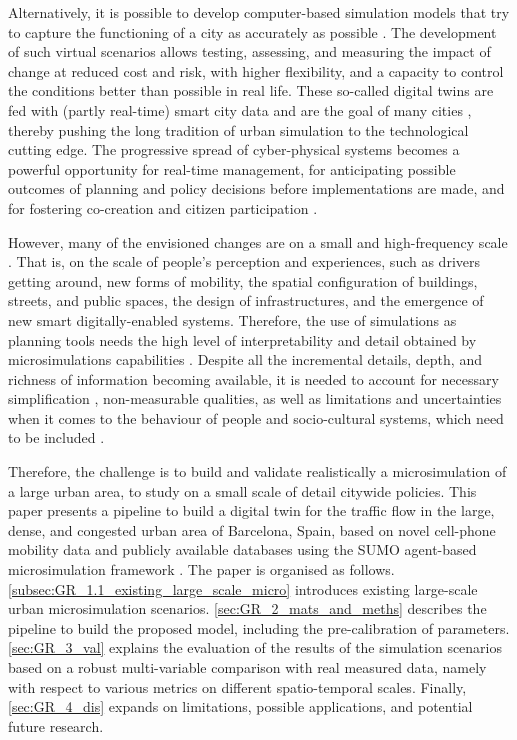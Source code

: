 Alternatively, it is possible to develop computer-based simulation models that try to capture the functioning of a city as accurately as possible \citep{Batty2018}. The development of such virtual scenarios allows testing, assessing, and measuring the impact of change at reduced cost and risk, with higher flexibility, and a capacity to control the conditions better than possible in real life. These so-called digital twins \citep{Grieves2014} are fed with (partly real-time) smart city data \citep{White2021} and are the goal of many cities \citep{Schrotter2020,AyuntamientodeMadrid2021,GovernmentofSingapore2018,EuropeanCommission2019,Airaksinen2019,Hourdos2008}, thereby pushing the long tradition of urban simulation \citep{Lowry1964,Forrester1969,Acheampong2015,Wegener2021Land-UseModels} to the technological cutting edge. The progressive spread of cyber-physical systems \citep{Tomko2019,Batty2019} becomes a powerful opportunity for real-time management, for anticipating possible outcomes of planning and policy decisions before implementations are made, and for fostering co-creation and citizen participation \citep{White2021}.

However, many of the envisioned changes are on a small and high-frequency scale \citep{Batty2018,Wildfire2018}. That is, on the scale of people’s perception and experiences, such as drivers getting around, new forms of mobility, the spatial configuration of buildings, streets, and public spaces, the design of infrastructures, and the emergence of new smart digitally-enabled systems. Therefore, the use of simulations as planning tools needs the high level of interpretability and detail obtained by microsimulations capabilities \citep{Treiber2013}. Despite all the incremental details, depth, and richness of information becoming available, it is needed to account for necessary simplification \citep{Batty2018}, non-measurable qualities, as well as limitations and uncertainties when it comes to the behaviour of people and socio-cultural systems, which need to be included \citep{Mathias2020}.

Therefore, the challenge is to build and validate realistically a microsimulation of a large urban area, to study on a small scale of detail citywide policies. This paper presents a pipeline to build a digital twin for the traffic flow in the large, dense, and congested urban area of Barcelona, Spain, based on novel cell-phone mobility data and publicly available databases using the SUMO agent-based microsimulation framework \citep{Lopez2018}. The paper is organised as follows. \autoref{subsec:GR_1.1_existing_large_scale_micro} introduces existing large-scale urban microsimulation scenarios. \autoref{sec:GR_2_mats_and_meths} describes the pipeline to build the proposed model, including the pre-calibration of parameters. \autoref{sec:GR_3_val} explains the evaluation of the results of the simulation scenarios based on a robust multi-variable comparison with real measured data, namely with respect to various metrics on different spatio-temporal scales. Finally, \autoref{sec:GR_4_dis} expands on limitations, possible applications, and potential future research.


